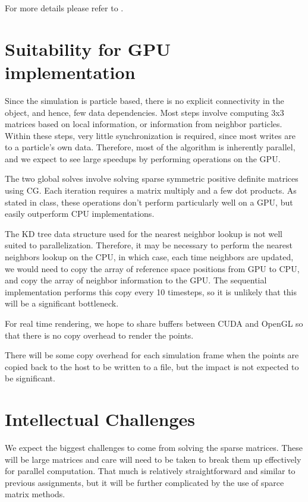 \documentclass[cameraready]{acmsiggraph-awb}
\begin{document}
For more details please refer to \cite{us}.

\section{Suitability for GPU implementation}

Since the simulation is particle based, there is no explicit connectivity in the object, and hence, few data dependencies.  
Most steps involve computing 3x3 matrices based on local information, or information from neighbor particles.  
Within these steps, very little synchronization is required, since most writes are to a particle's own data. 
Therefore, most of the algorithm is inherently parallel, and we expect to see large speedups by performing operations on the GPU.  

The two global solves involve solving sparse symmetric positive definite matrices using CG.  Each iteration requires a matrix multiply and a few dot products.  As stated in class, these operations don't perform particularly well on a GPU, but easily outperform CPU implementations.

The KD tree data structure used for the nearest neighbor lookup is not well suited to parallelization.  
Therefore, it may be necessary to perform the nearest neighbors lookup on the CPU, in which case, each time neighbors are updated, we would need to copy the array of reference space positions from GPU to CPU, and copy the array of neighbor information to the GPU.  The sequential implementation performs this copy every 10 timesteps, so it is unlikely that this will be a significant bottleneck.  

For real time rendering, we hope to share buffers between CUDA and OpenGL so that there is no copy overhead to render the points.  

There will be some copy overhead for each simulation frame when the points are copied back to the host to be written to a file, 
but the impact is not expected to be significant.

\section{Intellectual Challenges}

We expect the biggest challenges to come from solving the sparse matrices.
These will be large matrices and care will need to be taken to break them up effectively for parallel computation.
That much is relatively straightforward and similar to previous assignments, but it will be further complicated by the use of sparce matrix methods.
\end{document}
